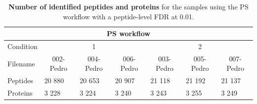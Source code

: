 \documentclass[11pt]{article}
\begin{document}
\begin{table}[h]
    \begin{tabular}{lllllll}
    \hline
    \multicolumn{7}{c}{PS workflow}                                                                                                                                                                                   \\ \hline
    Condition & \multicolumn{3}{c}{1}                                                                         & \multicolumn{3}{c}{2}                                                                         \\
    Filename       & \multicolumn{1}{c}{002-Pedro} & \multicolumn{1}{c}{004-Pedro} & \multicolumn{1}{c}{006-Pedro} & \multicolumn{1}{c}{003-Pedro} & \multicolumn{1}{c}{005-Pedro} & \multicolumn{1}{c}{007-Pedro} \\
    Peptides  & 20 880                        & 20 653                        & 20 907                        & 21 118                        & 21 192                        & 21 137                        \\
    Proteins  & 3 228                         & 3 224                         & 3 240                         & 3 243                         & 3 255                         & 3 249                         \\ \hline
    \end{tabular}
     \caption{{\bf Number of identified peptides and proteins} for the samples using the PS workflow with a peptide-level FDR at 0.01.
          \label{fig:diann_peptide_and_protein_id}}
\end{table}
\end{document}
